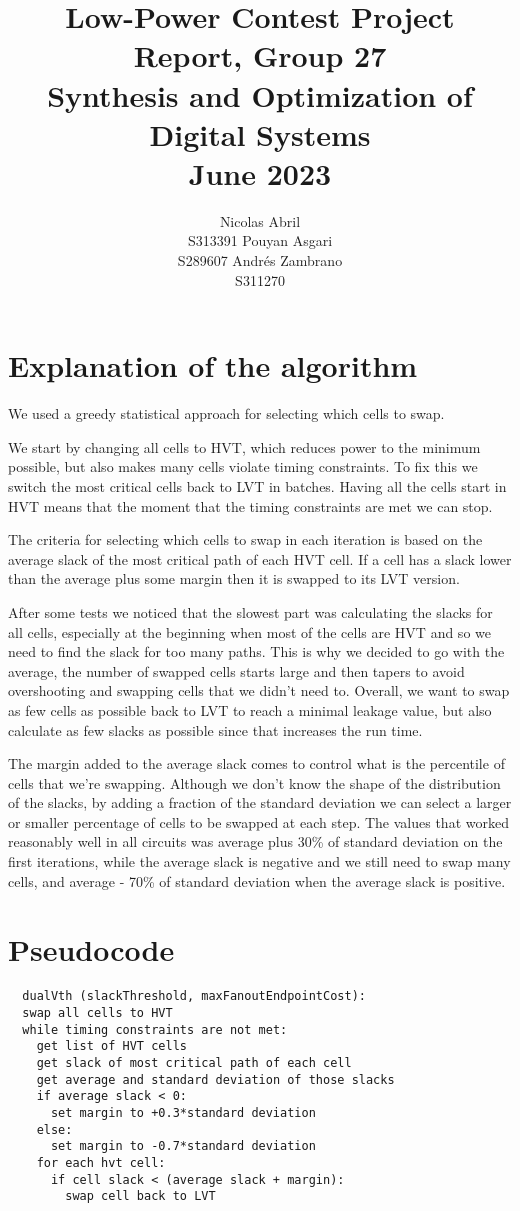 \documentclass[11pt]{article}
\title{Low-Power Contest Project Report, Group 27\\Synthesis and Optimization of Digital Systems\\June 2023}
\author{Nicolas Abril \\ S313391 \And  
        Pouyan Asgari \\ S289607 \And
        Andrés Zambrano \\ S311270}
\begin{document}
\maketitle

\section{Explanation of the algorithm}

We used a greedy statistical approach for selecting which cells to swap.

We start by changing all cells to HVT, which reduces power to the minimum possible, but also makes many cells violate timing constraints.
To fix this we switch the most critical cells back to LVT in batches.  
Having all the cells start in HVT means that the moment that the timing constraints are met we can stop.

The criteria for selecting which cells to swap in each iteration is based on the average slack of the most critical path of each HVT cell.
If a cell has a slack lower than the average plus some margin then it is swapped to its LVT version.

After some tests we noticed that the slowest part was calculating the slacks for all cells, especially at the beginning when most of the cells are HVT and so we need to find the slack for too many paths.
This is why we decided to go with the average, the number of swapped cells starts large and then tapers to avoid overshooting and swapping cells that we didn't need to.
Overall, we want to swap as few cells as possible back to LVT to reach a minimal leakage value, but also calculate as few slacks as possible since that increases the run time.

The margin added to the average slack comes to control what is the percentile of cells that we're swapping. Although we don't know the shape of the distribution of the slacks, by adding a fraction of the standard deviation we can select a larger or smaller percentage of cells to be swapped at each step.  
The values that worked reasonably well in all circuits was average plus 30\% of standard deviation on the first iterations, while the average slack is negative and we still need to swap many cells, and average - 70\% of standard deviation when the average slack is positive.

\section{Pseudocode}

\begin{verbatim}
  dualVth (slackThreshold, maxFanoutEndpointCost):
  swap all cells to HVT
  while timing constraints are not met:
    get list of HVT cells
    get slack of most critical path of each cell
    get average and standard deviation of those slacks
    if average slack < 0:
      set margin to +0.3*standard deviation
    else:
      set margin to -0.7*standard deviation
    for each hvt cell:
      if cell slack < (average slack + margin):
        swap cell back to LVT
\end{verbatim}
\end{document}
